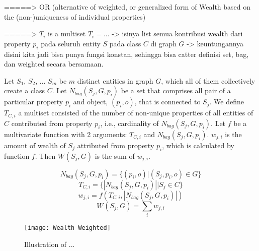 =====> OR (alternative of weighted, or generalized form of Wealth based on the (non-)uniqueness of individual properties)

=====> \(T_i\) is a multiset \(T_i = ... \) -> isinya list semua kontribusi wealth dari property \(p_i\) pada seluruh entity \(S\) pada class \(C\) di graph \(G\) -> keuntungannya disini kita jadi bisa punya fungsi konstan, sehingga bisa catter definisi set, bag, dan weighted secara bersamaan.

Let \(S_1\), \(S_2\), ... \(S_m\) be \(m\) distinct entities in graph \(G\), which all of them collectively create a class \(C\). Let \(N_{bag}(S_j,G,p_i)\) be a set that comprises all pair of a particular property \(p_i\) and object, \((p_i,o)\), that is connected to \(S_j\). We define \(T_{C,i}\) a multiset consisted of the number of non-unique properties of all entities of \(C\) contributed from property \(p_i\), i.e., cardinality of \(N_{bag}(S_j,G,p_i)\). Let \(f\) be a multivariate function with 2 arguments: \(T_{C,i}\) and \(N_{bag}(S_j,G,p_i)\). \(w_{j,i}\) is the amount of wealth of \(S_j\) attributed from property \(p_i\), which is calculated by function \(f\). Then \(W_{}(S_j, G)\) is the sum of \(w_{j,i}\).


\[
    N_{bag}(S_j,G,p_i) = \{(p_i,o) | (S_j, p_i, o) \in G\}
\]
\[
    T_{C,i} = \{|N_{bag}(S_j,G,p_i)| | S_j \in C\}
\]
\[
    w_{j,i} = f(T_{C,i}, |N_{bag}(S_j,G,p_i)|)
\]
\[
    W_{}(S_j, G) = \sum_i w_{j,i}
\]

\begin{figure}
    \centering
    \texttt{[image: Wealth Weighted]}
    \caption{Illustration of ...}
    \label{fig:wealth-weighted}
\end{figure}